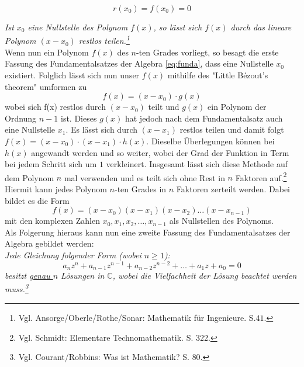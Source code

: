 \documentclass[a4paper,12pt]{article} %
\begin{document}
\begin{equation}\label{eq:bezout0}
r(x_0) = f(x_0)=0
\end{equation}


\noindent \emph{Ist $x_0$ eine Nullstelle des Polynom $f(x)$, so lässt sich $f(x)$ durch das lineare Polynom $(x-x_0)$ restlos teilen.\footnote{Vgl. Ansorge/Oberle/Rothe/Sonar: Mathematik für Ingenieure. S.$41$.}}\\



Wenn nun ein Polynom $f(x)$ des $n$-ten Grades vorliegt, so besagt die erste Fassung des Fundamentalsatzes der Algebra \eqref{eq:funda}, dass eine Nullstelle $x_0$ existiert. Folglich lässt sich nun unser $f(x)$ mithilfe des "Little Bézout's theorem" {} umformen zu
\[f(x)=(x-x_0) \cdot g(x)\]
wobei sich f(x) restlos durch $(x-x_0)$ teilt und $g(x)$ ein Polynom der Ordnung $n-1$ ist.
Dieses $g(x)$ hat jedoch nach dem Fundamentalsatz auch eine Nullstelle $x_1$.
Es lässt sich durch $(x-x_1)$ restlos teilen und damit folgt $f(x) = (x-x_0) \cdot (x-x_1) \cdot h(x)$.
Dieselbe Überlegungen können bei $h(x)$ angewandt werden und so weiter, wobei der Grad der Funktion in Term bei jedem Schritt sich um $1$ verkleinert.
Insgesamt lässt sich diese Methode auf dem Polynom $n$ mal verwenden und es teilt sich ohne Rest in $n$ Faktoren auf.\footnote{Vgl. Schmidt: Elementare Technomathematik. S. $322$.}\\

Hiermit kann jedes Polynom $n$-ten Grades in $n$ Faktoren zerteilt werden.
Dabei bildet es die Form
\begin{equation}\label{eq.faktor}
	\boxed{f(x)=(x-x_0)(x-x_1)(x-x_2)\dots(x-x_{n-1})}
\end{equation}
mit den komplexen Zahlen $x_0, x_1, x_2,\dots,x_{n-1}$ als Nullstellen des Polynoms.\\




Als Folgerung hieraus kann nun eine zweite Fassung des Fundamentalsatzes der Algebra gebildet werden:\\

\noindent \emph{Jede Gleichung folgender Form (wobei $n \geq 1$):
\begin{equation}\label{eq:funda2}
		a_nz^n + a_{n-1}z^{n-1} + a_{n-2}z^{n-2} + \dots + a_1z + a_0 = 0	
\end{equation}
besitzt \underline{genau $n$} Lösungen in $\mathbb{C}$, wobei die Vielfachheit der Lösung beachtet werden muss.\footnote{Vgl. Courant/Robbins: Was ist Mathematik? S. $80$.}}\\
\end{document}
